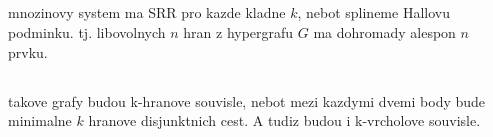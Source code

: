 \documentclass[a4paper]{article}
\begin{document}
\subsection{}
mnozinovy system ma SRR pro kazde kladne $k$, nebot splineme Hallovu podminku.
tj. libovolnych $n$ hran z hypergrafu $G$ ma dohromady alespon $n$ prvku.

\subsection{}
takove grafy budou k-hranove souvisle, nebot mezi kazdymi dvemi body bude minimalne $k$ hranove disjunktnich cest. A tudiz budou i k-vrcholove souvisle.
 
\end{document}
